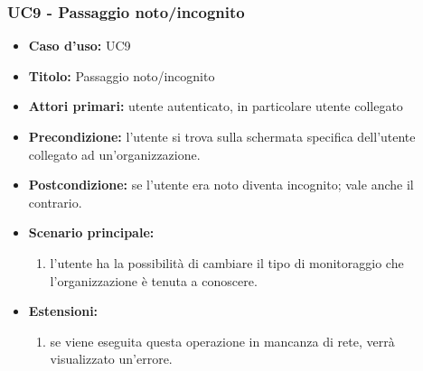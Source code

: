 \documentclass[casi-duso]{subfiles}
\begin{document}
\subsubsection{UC9 - Passaggio noto/incognito}
\label{subsub:uc9utente}
\begin{itemize}
  \item \textbf{Caso d’uso:} UC9
  \item \textbf{Titolo:} Passaggio noto/incognito
  \item \textbf{Attori primari:} utente autenticato, in particolare utente collegato
  \item \textbf{Precondizione:} l'utente si trova sulla schermata specifica dell'utente collegato ad un'organizzazione.
  \item \textbf{Postcondizione:} se l'utente era noto diventa incognito; vale anche il contrario.
  \item \textbf{Scenario principale:} 
  \begin{enumerate}
    \item l'utente ha la possibilità di cambiare il tipo di monitoraggio che l'organizzazione è tenuta a conoscere.
  \end{enumerate}  
  \item \textbf{Estensioni:} 
  \begin{enumerate}
    \item se viene eseguita questa operazione in mancanza di rete, verrà visualizzato un'errore. 
  \end{enumerate}  
\end{itemize}

\end{document}
